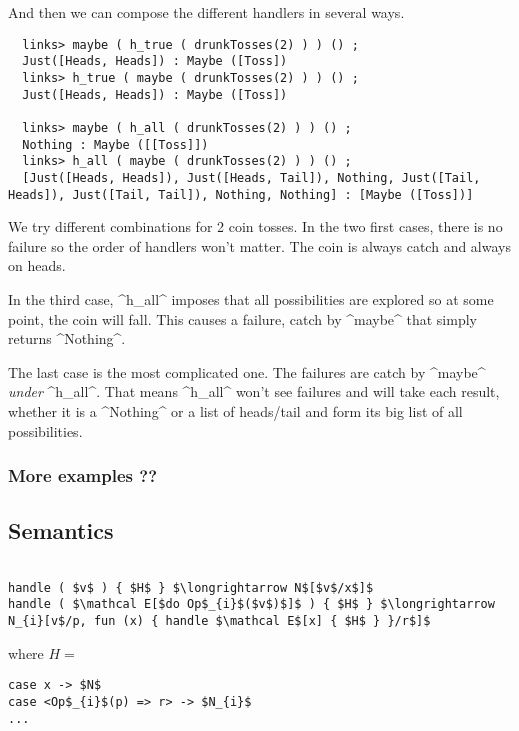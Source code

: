 \documentclass[nonacm=true, language=french, language=english]{acmart}
\begin{document}
And then we can compose the different handlers in several ways.

\begin{lstlisting}
  links> maybe ( h_true ( drunkTosses(2) ) ) () ;
  Just([Heads, Heads]) : Maybe ([Toss])
  links> h_true ( maybe ( drunkTosses(2) ) ) () ;
  Just([Heads, Heads]) : Maybe ([Toss])

  links> maybe ( h_all ( drunkTosses(2) ) ) () ;
  Nothing : Maybe ([[Toss]])
  links> h_all ( maybe ( drunkTosses(2) ) ) () ;
  [Just([Heads, Heads]), Just([Heads, Tail]), Nothing, Just([Tail, Heads]), Just([Tail, Tail]), Nothing, Nothing] : [Maybe ([Toss])]
\end{lstlisting}

We try different combinations for 2 coin tosses. In the two first cases, there is no failure so the order of handlers won't matter. The coin is always catch and always on heads.

In the third case, ^h_all^ imposes that all possibilities are explored so at some point, the coin will fall. This causes a failure, catch by ^maybe^ that simply returns ^Nothing^.

The last case is the most complicated one. The failures are catch by ^maybe^ \emph{under} ^h_all^. That means ^h_all^ won't see failures and will take each result, whether it is a ^Nothing^ or a list of heads/tail and form its big list of all possibilities.

\subsubsection{More examples ??}


\subsection{Semantics}
\label{sec:semantics}




\begin{lstlisting}[mathescape, numbers=none]

handle ( $v$ ) { $H$ } $\longrightarrow N$[$v$/x$]$
handle ( $\mathcal E[$do Op$_{i}$($v$)$]$ ) { $H$ } $\longrightarrow N_{i}[v$/p, fun (x) { handle $\mathcal E$[x] { $H$ } }/r$]$
\end{lstlisting}

where
$H =$ \begin{lstlisting}[mathescape, numbers=none]
case x -> $N$
case <Op$_{i}$(p) => r> -> $N_{i}$
...
\end{lstlisting}
\end{document}

